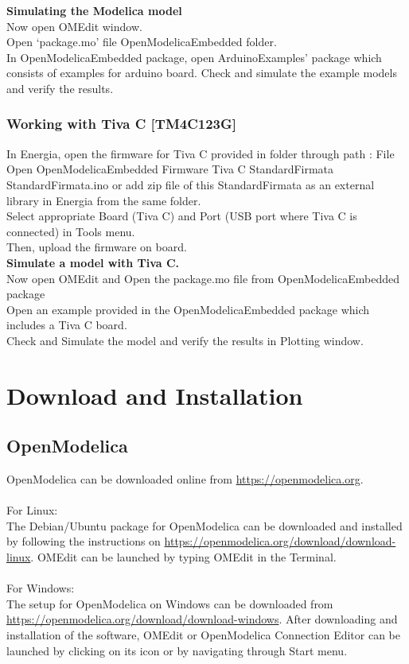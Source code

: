 \documentclass[12pt,a4paper]{report}
\begin{document}
\textbf{Simulating the Modelica model}\\
Now open OMEdit window.\\
Open ‘package.mo’ file OpenModelicaEmbedded folder.\\
In OpenModelicaEmbedded package, open ArduinoExamples’ package which consists of examples for arduino board. Check and simulate the example models and verify the results.

\subsection{Working with Tiva C [TM4C123G]}
In Energia, open the firmware for Tiva C provided in folder through path : File \textrightarrow  Open \textrightarrow  OpenModelicaEmbedded \textrightarrow  Firmware \textrightarrow  Tiva C \textrightarrow  StandardFirmata \textrightarrow \\ StandardFirmata.ino or add zip file of this StandardFirmata as an external library in Energia from the same folder.\\
Select appropriate Board (Tiva C) and Port (USB port where Tiva C is connected) in Tools menu.\\
Then, upload the firmware on board.\\

\textbf{Simulate a model with Tiva C.}\\
Now open OMEdit and Open the package.mo file from OpenModelicaEmbedded package\\
Open an example provided in the OpenModelicaEmbedded package which includes a Tiva C board.\\
Check and Simulate the model and verify the results in Plotting window.\\

\chapter{\textbf{Download and Installation}}
\section{OpenModelica}
OpenModelica can be downloaded online from  \url{https://openmodelica.org}.\\
\\
For Linux:\\
The Debian/Ubuntu package for OpenModelica can be downloaded and installed by following the instructions on \url{https://openmodelica.org/download/download-linux}. OMEdit can be launched by typing OMEdit in the Terminal.\\
\\
For Windows:\\
The setup for OpenModelica on Windows can be downloaded from \url{https://openmodelica.org/download/download-windows}. After downloading and installation of the software, OMEdit or OpenModelica Connection Editor can be launched by clicking on its icon or by navigating through Start menu.
\end{document}
